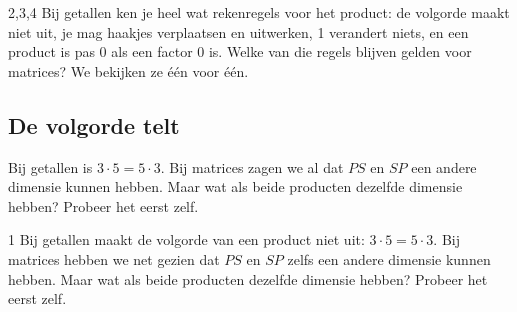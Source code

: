 \begin{alleenvoor}{2,3,4}
Bij getallen ken je heel wat rekenregels voor het product: de volgorde maakt niet uit, je mag haakjes verplaatsen en uitwerken, 1 verandert niets, en een product is pas 0 als een factor 0 is. Welke van die regels blijven gelden voor matrices? We bekijken ze één voor één.

\subsection{De volgorde telt}

Bij getallen is $3 \cdot 5 = 5 \cdot 3$. Bij matrices zagen we al dat $PS$ en $SP$ een andere dimensie kunnen hebben. Maar wat als beide producten dezelfde dimensie hebben? Probeer het eerst zelf.
\end{alleenvoor}
\begin{alleenvoor}{1}
Bij getallen maakt de volgorde van een product niet uit: $3 \cdot 5 = 5 \cdot 3$. Bij matrices hebben we net gezien dat $PS$ en $SP$ zelfs een andere dimensie kunnen hebben. Maar wat als beide producten dezelfde dimensie hebben? Probeer het eerst zelf.
\end{alleenvoor}

\begin{oefeningen}
\end{oefeningen}

